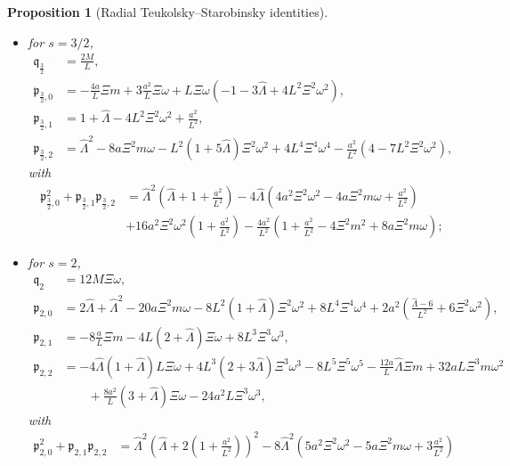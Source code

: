 \documentclass[11pt]{article}
\newtheorem{proposition}{Proposition}[section]
\numberwithin{equation}{section}
\begin{document}
\begin{proposition}[Radial Teukolsky--Starobinsky identities]
\begin{itemize}
\begin{gather*}
\mathfrak{p}_{1,2}= 2L^3\Xi^3\omega^3-2L\hat\Lambda\Xi\omega+\frac{2a}{L}(a\Xi\omega-\Xi m),
\end{gather*}
with $\mathfrak{p}_{1,0}^2+\mathfrak{p}_{1,1}\mathfrak{p}_{1,2}=\hat \Lambda^2+4a\Xi^2 m\omega-4a^2\Xi^2\omega^2$;
\item for $s=3/2$,
\begin{align*}
\mathfrak q_{\frac32}&=\frac{2M}{L}, \\
\mathfrak p_{\frac32,0}
&= -\frac{4a}{L}\Xi m + 3\frac{a^2}{L}\Xi\omega
+ L\Xi\omega(-1 - 3\hat\Lambda + 4L^2\Xi^2\omega^2),\\
\mathfrak p_{\frac32,1}
&=  1 + \hat\Lambda - 4L^2\Xi^2\omega^2+\frac{a^2}{L^2},\\
\mathfrak p_{\frac32,2}
&= \hat\Lambda^2 - 8a\Xi^2m\omega
- L^2(1 + 5\hat\Lambda)\Xi^2\omega^2
+ 4L^4\Xi^4\omega^4
- \frac{a^2}{L^2}(4 - 7L^2\Xi^2\omega^2),
\end{align*}
with
\begin{align*} \mathfrak p_{\frac32,0}^2+\mathfrak p_{\frac32,1}\mathfrak p_{\frac32,2}&=\hat\Lambda^2\left(\hat\Lambda+1+\frac{a^2}{L^2}\right)-4\hat\Lambda\left(4a^2\Xi^2\omega^2-4a\Xi^2m\omega+\frac{a^2}{L^2}\right)\\
&+16a^2\Xi^2\omega^2\left(1+\frac{a^2}{L^2}\right) -\frac{4a^2}{L^2}\left(1+\frac{a^2}{L^2}-4\Xi^2m^2+8a\Xi^2m\omega\right);
\end{align*}
\item for $s=2$,
\begin{align*}
\mathfrak q_{2}&=12M\Xi\omega, \\
\mathfrak p_{2,0}
&= 2\hat\Lambda + \hat\Lambda^2 - 20a\Xi^2m\omega
- 8L^2(1+\hat\Lambda)\Xi^2\omega^2
+ 8L^4\Xi^4\omega^4
+ 2a^2\left(\frac{\hat\Lambda - 6}{L^2} + 6\Xi^2\omega^2\right),\\
\mathfrak p_{2,1}
&= -8\frac{a}{L}\Xi m - 4L(2+\hat\Lambda)\Xi\omega
+ 8L^3\Xi^3\omega^3,\\
\mathfrak p_{2,2}
&= -4\hat\Lambda(1+\hat\Lambda)L\Xi\omega
+ 4L^3(2+3\hat\Lambda)\Xi^3\omega^3
- 8L^5\Xi^5\omega^5
- \frac{12a}{L}\hat\Lambda\Xi m
+ 32aL\Xi^3m\omega^2
\\
&\qquad + \frac{8a^2}{L}(3+\hat\Lambda)\Xi\omega
- 24a^2L\Xi^3\omega^3,
\end{align*}
with
\begin{align*}
\mathfrak{p}_{2,0}^2+\mathfrak{p}_{2,1}\mathfrak{p}_{2,2}&=\hat\Lambda^2\left(\hat\Lambda+2\left(1+\frac{a^2}{L^2}\right)\right)^2
-8\hat\Lambda^2\left(5a^2\Xi^2\omega^2-5a\Xi^2m\omega+3\frac{a^2}{L^2}\right)\\

\end{align*}
\end{itemize}
\end{proposition}
\end{document}
